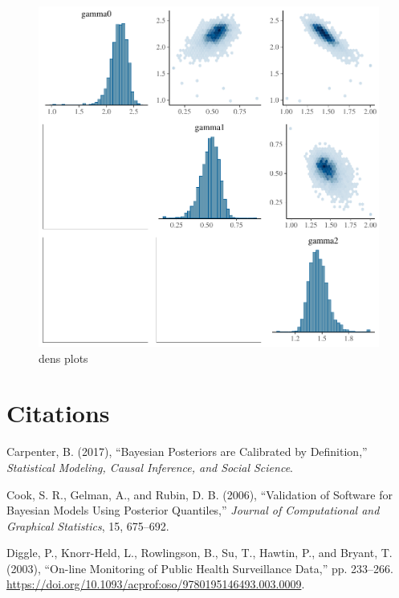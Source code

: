 \documentclass[11pt,a4paper]{article}
\numberwithin{equation}{section}
\begin{document}
\begin{figure}
\centering
\includegraphics{thesis_draft_files/figure-latex/unnamed-chunk-14-1.pdf}
\caption{\label{fig:pairs_gamma} dens plots}
\end{figure}

\pagebreak

\hypertarget{citations}{%
\section*{Citations}\label{citations}}

\hypertarget{refs}{}
\leavevmode\hypertarget{ref-carpenter_bayesian_2017}{}%
Carpenter, B. (2017), ``Bayesian Posteriors are Calibrated by
Definition,'' \emph{Statistical Modeling, Causal Inference, and Social
Science}.

\leavevmode\hypertarget{ref-cook_validation_2006}{}%
Cook, S. R., Gelman, A., and Rubin, D. B. (2006), ``Validation of
Software for Bayesian Models Using Posterior Quantiles,'' \emph{Journal
of Computational and Graphical Statistics}, 15, 675--692.

\leavevmode\hypertarget{ref-diggle_-line_2003}{}%
Diggle, P., Knorr-Held, L., Rowlingson, B., Su, T., Hawtin, P., and
Bryant, T. (2003), ``On-line Monitoring of Public Health Surveillance
Data,'' pp. 233--266.
\url{https://doi.org/10.1093/acprof:oso/9780195146493.003.0009}.
\end{document}
